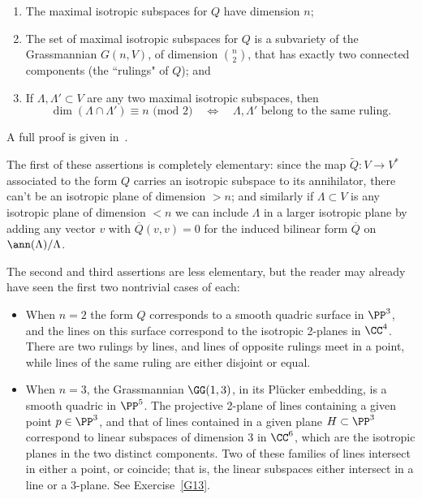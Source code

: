 \begin{fact}
 \begin{enumerate}
\item The maximal isotropic subspaces for $Q$ have dimension $n$;

\item The set of maximal isotropic subspaces for $Q$ is a subvariety of the Grassmannian $G(n,V)$, of dimension $\binom{n}{2}$, that has exactly two connected components (the ``rulings" of $Q$); and

\item If $\Lambda, \Lambda' \subset V$ are any two maximal isotropic subspaces, then
$$
\dim(\Lambda \cap \Lambda') \equiv n \text{ (mod 2)} \quad \iff \quad \Lambda, \Lambda' \text{ belong to the same ruling.}
$$
\end{enumerate} 
A full proof is given in~\cite[pp. 735--740]{Griffiths-Harris1978}.
\end{fact}

The first of these assertions is completely elementary: since the map $\widetilde Q : V \to V^*$ associated to the form $Q$ carries an isotropic subspace to its annihilator, there can't be an isotropic plane of dimension $>n$; and similarly if $\Lambda \subset V$ is any isotropic plane of dimension $<n$ we can include $\Lambda$ in a larger isotropic plane by adding any vector $v$ with $\overline Q(v,v) = 0$ for the induced bilinear form $\overline Q$ on $\ann(\Lambda)/\Lambda$.

The second and third assertions are less elementary, but the reader may already have seen the first two nontrivial cases of each: 

\begin{example}
\begin{itemize}

\item When $n=2$ the form $Q$ corresponds to a smooth quadric surface in $\PP^3$, and the lines on this surface correspond to the isotropic 2-planes in $\CC^4$. There are two rulings by lines, and lines of opposite rulings meet in a point, while lines of the same ruling are either disjoint or equal. 

\item When $n=3$, the Grassmannian $\GG(1,3)$, in its Pl\"ucker embedding, is a smooth quadric in $\PP^5$. The projective 2-plane of lines containing a given point $p \in \PP^3$, and that of lines contained in a given plane $H \subset \PP^3$
correspond to linear subspaces of dimension 3 in $\CC^6$, which are the isotropic planes in the two distinct components. Two of these families of lines intersect in either a point, or coincide; that is, the linear subspaces either intersect  in a line or a 3-plane. See Exercise~\ref{G13}.

\end{itemize}
\end{example}

